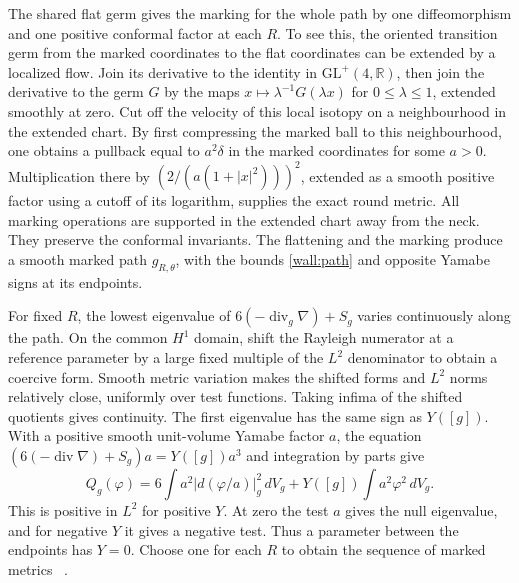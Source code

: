 \documentclass[11pt]{article}
\numberwithin{equation}{section}
\theoremstyle{definition}
\theoremstyle{remark}
\begin{document}
The shared flat germ gives the marking for the whole path by
one diffeomorphism and one positive conformal factor at each
\(R\). To see this, the oriented transition germ from the
marked coordinates to the flat coordinates can be extended by a
localized flow. Join its derivative to the identity in
\(\mathrm{GL}^+(4,\mathbb R)\), then join the derivative to the
germ \(G\) by the maps \(x\mapsto \lambda^{-1}G(\lambda x)\)
for \(0\le\lambda\le1\), extended smoothly at zero. Cut off the
velocity of this local isotopy on a neighbourhood in the extended
chart. By first compressing the marked ball to this neighbourhood,
one obtains a pullback equal to \(a^2\delta\) in the marked
coordinates for some \(a>0\). Multiplication there by
\((2/(a(1+|x|^2)))^2\), extended as a smooth positive factor
using a cutoff of its logarithm, supplies the exact round metric.
All marking operations are supported in the extended chart
away from the neck. They preserve the conformal invariants.
The flattening and the marking produce a smooth marked path
\(g_{R,\theta}\), with the bounds \eqref{wall:path} and opposite
Yamabe signs at its endpoints.

For fixed \(R\), the lowest eigenvalue of
\(6(-\operatorname{div}_g\nabla)+S_g\) varies continuously along
the path. On the common \(H^1\) domain, shift the Rayleigh
numerator at a reference parameter by a large fixed multiple
of the \(L^2\) denominator to obtain a coercive form.
Smooth metric variation makes the shifted forms and \(L^2\)
norms relatively close, uniformly over test functions.
Taking infima of the shifted quotients gives continuity.
The first eigenvalue has the same sign as \(Y([g])\).
With a positive smooth unit-volume Yamabe factor \(a\), the
equation \((6(-\operatorname{div}\nabla)+S_g)a=Y([g])a^3\)
and integration by parts give
\[
 Q_g(\varphi)=6\int a^2|d(\varphi/a)|_g^2\,dV_g
                  +Y([g])\int a^2\varphi^2\,dV_g.
\]
This is positive in \(L^2\) for positive \(Y\). At zero the
test \(a\) gives the null eigenvalue, and for negative \(Y\)
it gives a negative test. Thus a parameter between the
endpoints has \(Y=0\). Choose one for each \(R\) to obtain
the sequence of marked metrics~\cite[\S3, Theorem 3]{Schoen1984Yamabe}
\cite[\S1]{LeeParker1987Yamabe}.
\end{document}
